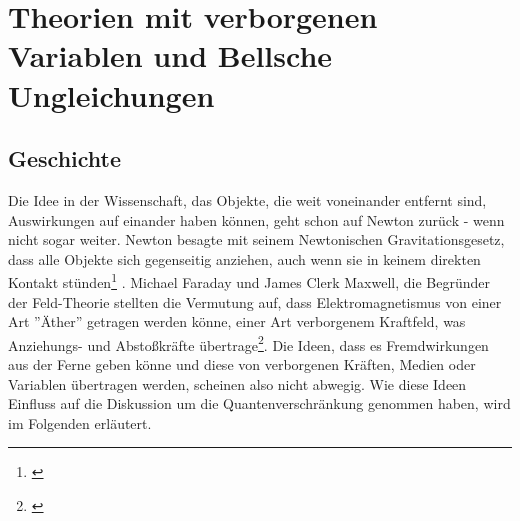 \section{Theorien mit verborgenen Variablen und Bellsche Ungleichungen}
\label{sec:theorien_mit_verborgenen_variablen_bellsche_ungleichungen}


\subsection{Geschichte}
\label{subsec:geschichte}

Die Idee in der Wissenschaft, das Objekte, die weit voneinander entfernt sind, Auswirkungen auf einander haben können, geht schon auf Newton zurück - wenn nicht sogar weiter. Newton besagte mit seinem Newtonischen Gravitationsgesetz, dass alle Objekte sich gegenseitig anziehen, auch wenn sie in keinem direkten Kontakt stünden\footnote{\cite{newton_gravitation_2009}} . Michael Faraday und James Clerk Maxwell, die Begründer der Feld-Theorie stellten die Vermutung auf, dass Elektromagnetismus
von einer Art ''Äther'' getragen werden könne, einer Art verborgenem Kraftfeld, was Anziehungs- und Abstoßkräfte übertrage\footnote{\cite{faraday_maxwell_ether}}. Die Ideen, dass es Fremdwirkungen aus der Ferne geben könne und diese von verborgenen
Kräften, Medien oder Variablen übertragen werden, scheinen also nicht abwegig. Wie diese Ideen Einfluss auf die Diskussion um die Quantenverschränkung genommen haben, wird im Folgenden erläutert. \\

